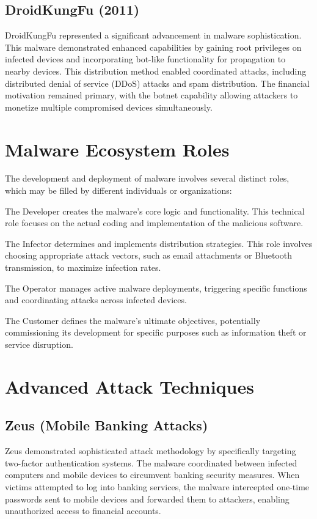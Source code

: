 \documentclass{article}
\begin{document}
\subsection{DroidKungFu (2011)}
DroidKungFu represented a significant advancement in malware sophistication. This malware demonstrated enhanced capabilities by gaining root privileges on infected devices and incorporating bot-like functionality for propagation to nearby devices. This distribution method enabled coordinated attacks, including distributed denial of service (DDoS) attacks and spam distribution. The financial motivation remained primary, with the botnet capability allowing attackers to monetize multiple compromised devices simultaneously.

\section{Malware Ecosystem Roles}
The development and deployment of malware involves several distinct roles, which may be filled by different individuals or organizations:

The Developer creates the malware's core logic and functionality. This technical role focuses on the actual coding and implementation of the malicious software.

The Infector determines and implements distribution strategies. This role involves choosing appropriate attack vectors, such as email attachments or Bluetooth transmission, to maximize infection rates.

The Operator manages active malware deployments, triggering specific functions and coordinating attacks across infected devices.

The Customer defines the malware's ultimate objectives, potentially commissioning its development for specific purposes such as information theft or service disruption.

\section{Advanced Attack Techniques}

\subsection{Zeus (Mobile Banking Attacks)}
Zeus demonstrated sophisticated attack methodology by specifically targeting two-factor authentication systems. The malware coordinated between infected computers and mobile devices to circumvent banking security measures. When victims attempted to log into banking services, the malware intercepted one-time passwords sent to mobile devices and forwarded them to attackers, enabling unauthorized access to financial accounts.
\end{document}
